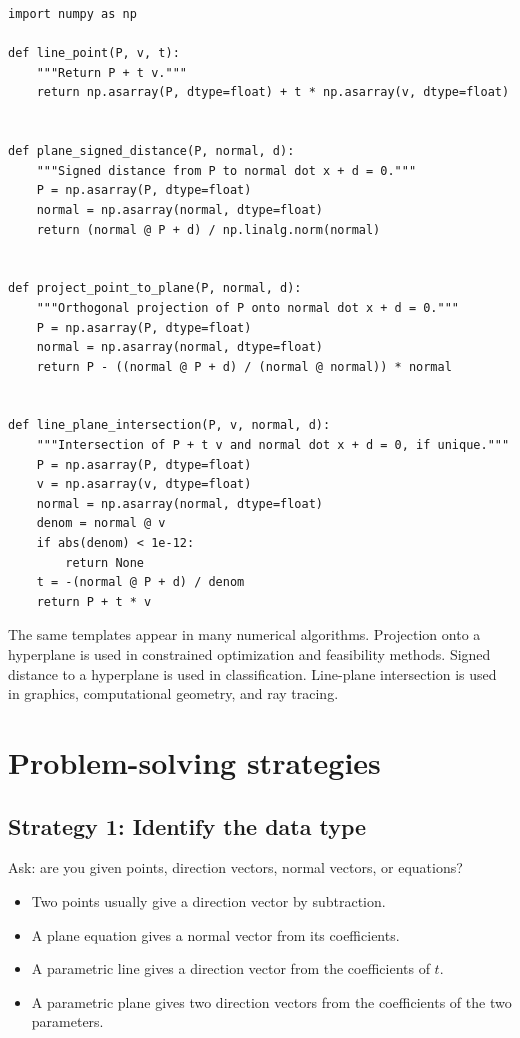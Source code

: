 \begin{lstlisting}[style=pythonstyle]
import numpy as np

def line_point(P, v, t):
    """Return P + t v."""
    return np.asarray(P, dtype=float) + t * np.asarray(v, dtype=float)


def plane_signed_distance(P, normal, d):
    """Signed distance from P to normal dot x + d = 0."""
    P = np.asarray(P, dtype=float)
    normal = np.asarray(normal, dtype=float)
    return (normal @ P + d) / np.linalg.norm(normal)


def project_point_to_plane(P, normal, d):
    """Orthogonal projection of P onto normal dot x + d = 0."""
    P = np.asarray(P, dtype=float)
    normal = np.asarray(normal, dtype=float)
    return P - ((normal @ P + d) / (normal @ normal)) * normal


def line_plane_intersection(P, v, normal, d):
    """Intersection of P + t v and normal dot x + d = 0, if unique."""
    P = np.asarray(P, dtype=float)
    v = np.asarray(v, dtype=float)
    normal = np.asarray(normal, dtype=float)
    denom = normal @ v
    if abs(denom) < 1e-12:
        return None
    t = -(normal @ P + d) / denom
    return P + t * v
\end{lstlisting}

The same templates appear in many numerical algorithms. Projection onto a hyperplane is used in constrained optimization and feasibility methods. Signed distance to a hyperplane is used in classification. Line-plane intersection is used in graphics, computational geometry, and ray tracing.

\section{Problem-solving strategies}

\subsection*{Strategy 1: Identify the data type}

Ask: are you given points, direction vectors, normal vectors, or equations?
\begin{itemize}
\item Two points usually give a direction vector by subtraction.
\item A plane equation gives a normal vector from its coefficients.
\item A parametric line gives a direction vector from the coefficients of $t$.
\item A parametric plane gives two direction vectors from the coefficients of the two parameters.
\end{itemize}

